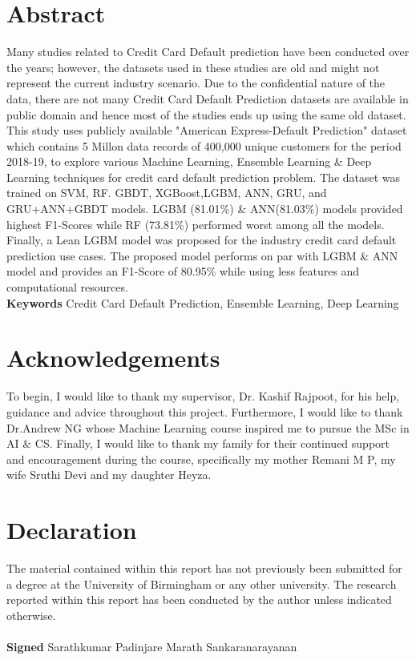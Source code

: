 \documentclass[twoside,11pt,a4paper]{article}
\begin{document}
\section*{\centering Abstract}	
Many studies related to Credit Card Default prediction have been conducted over the years; however, the datasets used in these studies are old and might not represent the current industry scenario. Due to the confidential nature of the data, there are not many Credit Card Default Prediction datasets are available in public domain and hence most of the studies ends up using the same old dataset. This study uses publicly available "American Express-Default Prediction" dataset which contains 5 Millon data records of 400,000 unique customers for the period 2018-19, to explore various Machine Learning, Ensemble Learning \& Deep Learning techniques for credit card default prediction problem. The dataset was trained on \acf{SVM}, \acf{RF}. \acf{GBDT}, \acf{XGBoost},\acf{LGBM}, \acf{ANN}, \acf{GRU}, and \acs{GRU}+\acs{ANN}+\acs{GBDT} models. \acs{LGBM} (81.01\%) \& \acs{ANN}(81.03\%) models provided highest F1-Scores while \acs{RF} (73.81\%) performed worst among all the models. Finally, a Lean \acs{LGBM} model was proposed for the industry  credit card default prediction use cases. The proposed model performs on par with \acs{LGBM} \& \acs{ANN} model and provides an F1-Score of 80.95\% while using less features and computational resources.\\



\textbf{Keywords} Credit Card Default Prediction, Ensemble Learning, Deep Learning

\vfill
\clearpage

\section*{\centering Acknowledgements}
To begin, I would like to thank my supervisor, Dr. Kashif Rajpoot, for his help, guidance and
advice throughout this project. Furthermore, I would like to thank Dr.Andrew NG whose Machine Learning course inspired me to pursue the MSc in AI \& CS.
Finally, I would like to thank my family for their continued support and encouragement during the course, specifically my mother Remani M P, my wife Sruthi Devi and my daughter Heyza.

\vfill
\clearpage
\section*{\centering Declaration}
The material contained within this report has not previously been
submitted for a degree at the University of Birmingham or any other university.
The research reported within this report has been conducted by the author
unless indicated otherwise.\\
\\
\textbf{Signed} Sarathkumar Padinjare Marath Sankaranarayanan 
\end{document}
